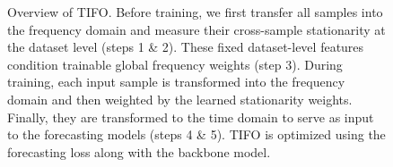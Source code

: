 \documentclass[sigconf,anonymous,review]{acmart}
\newcommand{\methodn}{\textsc{TIFO}}
\newcommand{\method}{\textsc{\methodn}\xspace}
\begin{document}
\begin{figure}[t]
  \centering
  \caption{
    Overview of \method. 
    Before training, we first transfer all samples into the frequency domain and measure their cross-sample stationarity at the dataset level (steps 1 \& 2).
    These fixed dataset-level features condition trainable global frequency weights (step 3).
    During training, each input sample is transformed into the frequency domain and then weighted by the learned stationarity weights.
    Finally, they are transformed to the time domain to serve as input to the forecasting models (steps 4 \& 5). 
    \method is optimized using the forecasting loss along with the backbone model.
  }
  \label{fig:model}
\end{figure}



\end{document}
